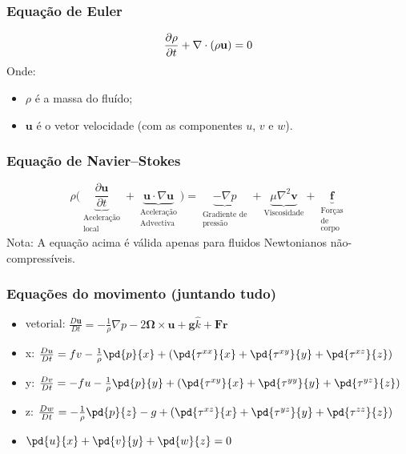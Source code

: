 \begin{frame}
\frametitle{Equação de Euler}
\[
    {\partial \rho  \over \partial t}+\nabla \cdot (\rho {\mathbf  u})=0
\]
Onde:
    \begin{itemize}
      \item $\rho$ é a massa do fluído;
      \item ${\mathbf  u}$ é o vetor velocidade (com as componentes $u$, $v$
            e $w$).
    \end{itemize}
\end{frame}


\begin{frame}
\frametitle{Equação de Navier–Stokes}
\[
\rho \Big(
\underbrace{\frac{\partial \mathbf{u}}{\partial t}}_{
\begin{smallmatrix}
  \text{Aceleração}\\
  \text{local}
\end{smallmatrix}} +
\underbrace{\mathbf{u} \cdot \nabla \mathbf{u}}_{
\begin{smallmatrix}
  \text{Aceleração} \\
  \text{Advectiva}
\end{smallmatrix}}\Big) =
\underbrace{-\nabla p}_{
\begin{smallmatrix}
  \text{Gradiente de} \\
  \text{pressão}
\end{smallmatrix}} +
\underbrace{\mu \nabla^2 \mathbf{v}}_{\text{Viscosidade}} +
\underbrace{\mathbf{f}}_{
\begin{smallmatrix}
  \text{Forças} \\
  \text{de} \\
  \text{corpo}
\end{smallmatrix}}
\]
Nota: A equação acima é válida apenas para fluidos Newtonianos
não-compressíveis.
\end{frame}

\begin{frame}
\frametitle{Equações do movimento (juntando tudo)}
  \begin{itemize}[<+-| alert@+>]
    \item vetorial: $\frac{D{\mathbf{u}}}{Dt} = -\frac{1}{\rho}\nabla{p} -2\mathbf{\Omega} \times \mathbf{u} + \mathbf{g}\hat{k} + \mathbf{Fr}$
    \item x: $\frac{Du}{Dt} = fv - \frac{1}{\rho}\pd{p}{x} + \left(\pd{\tau^{xx}}{x} + \pd{\tau^{xy}}{y} + \pd{\tau^{xz}}{z}\right)$
    \item y: $\frac{Dv}{Dt} = -fu - \frac{1}{\rho}\pd{p}{y} + \left(\pd{\tau^{xy}}{x} + \pd{\tau^{yy}}{y} + \pd{\tau^{yz}}{z}\right)$
    \item z: $\frac{Dw}{Dt} = - \frac{1}{\rho}\pd{p}{z} - g + \left(\pd{\tau^{xz}}{x} + \pd{\tau^{yz}}{y} + \pd{\tau^{zz}}{z}\right)$
    \item $\pd{u}{x} + \pd{v}{y} + \pd{w}{z} = 0$
  \end{itemize}
\end{frame}


